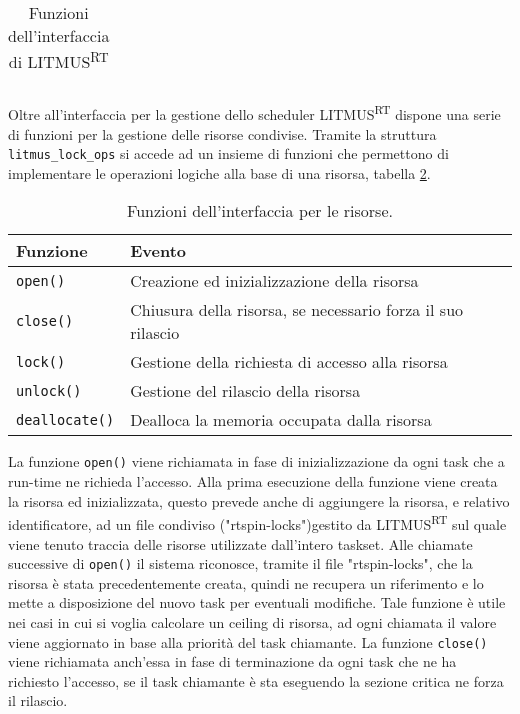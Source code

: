 \begin{appendices}
\begin{table}
\begin{tabular}{|ll|}
  	\hline
  	\end{tabular}
  \caption{Funzioni dell'interfaccia di LITMUS\textsuperscript{RT}}
  \label{tab:functions}
\end{table}

Oltre all'interfaccia per la gestione dello scheduler LITMUS\textsuperscript{RT} dispone una serie di funzioni per la gestione delle risorse condivise. Tramite la struttura \texttt{litmus\_lock\_ops} si accede ad un insieme di funzioni che permettono di implementare le operazioni logiche alla base di una risorsa, tabella \ref{tab:functions_resource}.\\

\begin{table}
  \centering
  \begin{tabular}{|ll|}
	\hline
	    Funzione & Evento \\ \hline \hline
	   
\texttt{open()}			& Creazione ed inizializzazione della risorsa \\
\texttt{close()}		& Chiusura della risorsa, se necessario forza il suo rilascio \\
\texttt{lock()}			& Gestione della richiesta di accesso alla risorsa \\
\texttt{unlock()}		& Gestione del rilascio della risorsa \\
\texttt{deallocate()}	& Dealloca la memoria occupata dalla risorsa \\

  	\hline
  	\end{tabular}
  \caption{Funzioni dell'interfaccia per le risorse.}
  \label{tab:functions_resource}
\end{table}

La funzione \texttt{open()} viene richiamata in fase di inizializzazione da ogni task che a run-time ne richieda l'accesso. Alla prima esecuzione della funzione viene creata la risorsa ed inizializzata, questo prevede anche di aggiungere la risorsa, e relativo identificatore, ad un file condiviso ("rtspin-locks")gestito da LITMUS\textsuperscript{RT} sul quale viene tenuto traccia delle risorse utilizzate dall'intero taskset. Alle chiamate successive di \texttt{open()} il sistema riconosce, tramite il file "rtspin-locks", che la risorsa è stata precedentemente creata, quindi ne recupera un riferimento e lo mette a disposizione del nuovo task per eventuali modifiche. Tale funzione è utile nei casi in cui si voglia calcolare un ceiling di risorsa, ad ogni chiamata il valore viene aggiornato in base alla priorità del task chiamante. La funzione \texttt{close()} viene richiamata anch'essa in fase di terminazione da ogni task che ne ha richiesto l'accesso, se il task chiamante è sta eseguendo la sezione critica ne forza il rilascio.\\


\end{appendices}
